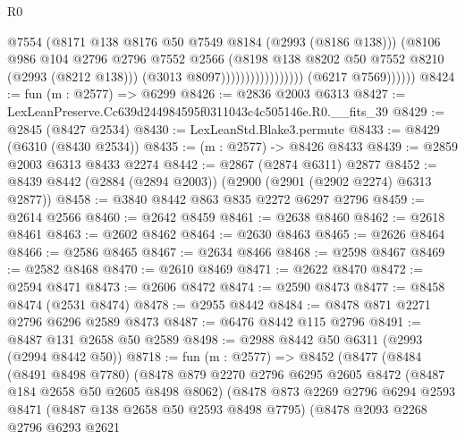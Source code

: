 \begin{lexlean}{R0}
\begin{coremodule}
                                            @7554
                                            (@8171 @138 @8176 @50 @7549 @8184 (@2993 (@8186 @138)))
                                            (@8106
                                              @986
                                              @104
                                              @2796
                                              @2796
                                              @7552
                                              @2566
                                              (@8198
                                                @138
                                                @8202
                                                @50
                                                @7552
                                                @8210
                                                (@2993 (@8212 @138)))
                                              (@3013 @8097)))))))))))))))))
              (@6217 @7569))))))
@8424 := fun (m : @2577) => @6299
@8426 := @2836 @2003 @6313
@8427 := LexLeanPreserve.Cc639d244984595f0311043c4c505146e.R0.__fits_39
@8429 := @2845 (@8427 @2534)
@8430 := LexLeanStd.Blake3.permute
@8433 := @8429 (@6310 (@8430 @2534))
@8435 := (m : @2577) -> @8426 @8433
@8439 := @2859 @2003 @6313 @8433 @2274
@8442 := @2867 (@2874 @6311) @2877
@8452 := @8439 @8442 (@2884 (@2894 @2003)) (@2900 (@2901 (@2902 @2274) @6313 @2877))
@8458 := @3840 @8442 @863 @835 @2272 @6297 @2796
@8459 := @2614 @2566
@8460 := @2642 @8459
@8461 := @2638 @8460
@8462 := @2618 @8461
@8463 := @2602 @8462
@8464 := @2630 @8463
@8465 := @2626 @8464
@8466 := @2586 @8465
@8467 := @2634 @8466
@8468 := @2598 @8467
@8469 := @2582 @8468
@8470 := @2610 @8469
@8471 := @2622 @8470
@8472 := @2594 @8471
@8473 := @2606 @8472
@8474 := @2590 @8473
@8477 := @8458 @8474 (@2531 @8474)
@8478 := @2955 @8442
@8484 := @8478 @871 @2271 @2796 @6296 @2589 @8473
@8487 := @6476 @8442 @115 @2796
@8491 := @8487 @131 @2658 @50 @2589
@8498 := @2988 @8442 @50 @6311 (@2993 (@2994 @8442 @50))
@8718 := fun (m : @2577) =>
  @8452
    (@8477
      (@8484
        (@8491 @8498 @7780)
        (@8478
          @879
          @2270
          @2796
          @6295
          @2605
          @8472
          (@8487 @184 @2658 @50 @2605 @8498 @8062)
          (@8478
            @873
            @2269
            @2796
            @6294
            @2593
            @8471
            (@8487 @138 @2658 @50 @2593 @8498 @7795)
            (@8478
              @2093
              @2268
              @2796
              @6293
              @2621

\end{coremodule}
\end{lexlean}
